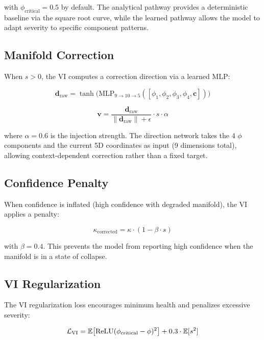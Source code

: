 with $\phi_{\text{critical}} = 0.5$ by default. The analytical pathway
provides a deterministic baseline via the square root curve, while
the learned pathway allows the model to adapt severity to specific
component patterns.

\subsection{Manifold Correction}

When $s > 0$, the VI computes a correction direction via a learned
MLP:

\begin{equation}
    \bm{d}_{\text{raw}} = \tanh\big(\text{MLP}_{9 \to 10 \to 5}([\phi_1, \phi_2, \phi_3, \phi_4, \bm{c}])\big)
\end{equation}

\begin{equation}
    \bm{v} = \frac{\bm{d}_{\text{raw}}}{\|\bm{d}_{\text{raw}}\| + \epsilon} \cdot s \cdot \alpha
    \label{eq:vi_correction}
\end{equation}

where $\alpha = 0.6$ is the injection strength. The direction network
takes the 4 $\phi$ components and the current 5D coordinates as input
(9 dimensions total), allowing context-dependent correction rather
than a fixed target.

\subsection{Confidence Penalty}

When confidence is inflated (high confidence with degraded manifold),
the VI applies a penalty:

\begin{equation}
    \kappa_{\text{corrected}} = \kappa \cdot (1 - \beta \cdot s)
    \label{eq:vi_conf_penalty}
\end{equation}

with $\beta = 0.4$. This prevents the model from reporting high
confidence when the manifold is in a state of collapse.

\subsection{VI Regularization}

The VI regularization loss encourages minimum health and penalizes
excessive severity:

\begin{equation}
    \mathcal{L}_{\text{VI}} = \mathbb{E}\big[\text{ReLU}(\phi_{\text{critical}} - \phi)^2\big]
    + 0.3 \cdot \mathbb{E}[s^2]
\end{equation}

